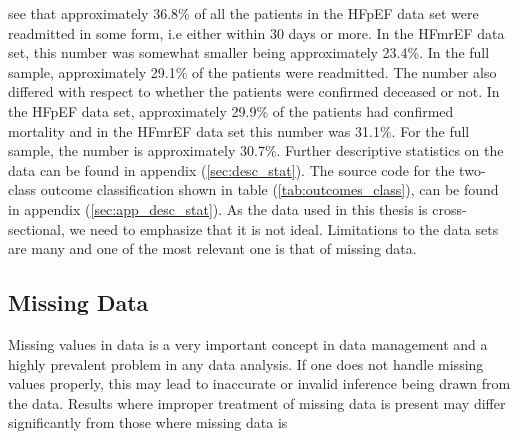 \documentclass[../thesis.tex]{subfiles}
\begin{document}
\vspace*{-0,5cm}\noindent see that approximately 36.8\% of all the patients in the HFpEF data set were readmitted in some form, i.e either within 30 days or more. In the HFmrEF data set, this number was somewhat smaller being approximately 23.4\%. In the full sample, approximately 29.1\% of the patients were readmitted. The number also differed with respect to whether the patients were confirmed deceased or not. In the HFpEF data set, approximately 29.9\% of the patients had confirmed mortality and in the HFmrEF data set this number was 31.1\%. For the full sample, the number is approximately 30.7\%. Further descriptive statistics on the data can be found in appendix (\ref{sec:desc_stat}). The source code for the two-class outcome classification shown in table (\ref{tab:outcomes_class}), can be found in appendix (\ref{sec:app_desc_stat}). As the data used in this thesis is cross-sectional, we need to emphasize that it is not ideal. Limitations to the data sets are many and one of the most relevant one is that of missing data. 

\subsection{Missing Data}
\label{subsec:miss_data}

\noindent Missing values in data is a very important concept in data management and a highly prevalent problem in any data analysis. If one does not handle missing values properly, this may lead to inaccurate or invalid inference being drawn from the data. Results where improper treatment of missing data is present may differ significantly from those where missing data is  


\end{document}
